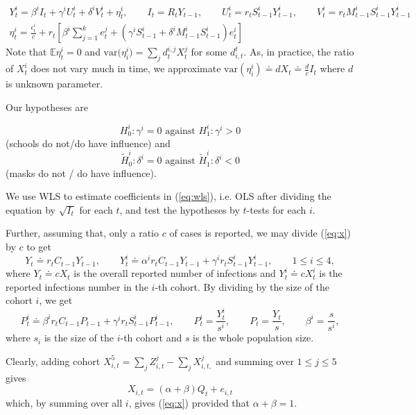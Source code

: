 \begin{multline*}
Y_{t}^{i}=\beta^{i}I_{t}+\gamma^{i}U_{t}^{i}+\delta^{i}V_{t}^{i}+\eta_{t}^{i},\qquad I_{t}=R_{t}Y_{t-1},\qquad U_{t}^{i}=r_{t}S_{t-1}^{i}Y_{t-1}^{i},\qquad V_{t}^{i}=r_{t}M_{t-1}^{i}S_{t-1}^{i}Y_{t-1}^{i}\\
\eta_{t}^{i}=\frac{\epsilon_{t}^{i}}{c}+r_{t}\left[\beta^{i}\sum_{j=1}^{k}e_{t}^{j}+(\gamma^{i}S_{t-1}^{i}+\delta^{i}M_{t-1}^{i}S_{t-1}^{i})e_{t}^{i}\right]
\end{multline*}
Note that $\mathbb{\ensuremath{E}}\eta_{t}^{i}=0$ and $\mathrm{var(}\eta_{i}^{i})=\sum_{j}d_{t}^{i,j}X_{t}^{j}$
for some $d_{i,t}^{t}$. As, in practice, the ratio of $X_{t}^{i}$
does not vary much in time, we approximate $\text{var}(\eta_{i}^{i})\doteq dX_{t}\doteq\frac{d}{c}I_{t}$
where $d$ is unknown parameter. 

Our hypotheses are 

\[
H_{0}^{i}:\gamma^{i}=0\text{ against }H_{1}^{i}:\gamma^{i}>0
\]
(schools do not/do have influence) and 
\[
\tilde{H}_{0}^{i}:\delta^{i}=0\text{ against }\tilde{H}_{1}^{i}:\delta^{i}<0
\]
(masks do not / do have influence).

We use WLS to estimate coefficients in (\ref{eq:wls}), i.e. OLS after
dividing the equation by $\sqrt{I_{t}}$ for each $t$, and test the
hypotheses by $t$-tests for each $i.$


Further, assuming that, only a ratio $c$ of cases is reported, we
may divide (\ref{eq:x}) by $c$ to get 
\begin{equation}
Y_{t}\doteq r_{t}C_{t-1}Y_{t-1},\qquad Y_{t}^{i}\doteq\alpha^{i}r_{t}C_{t-1}Y_{t-1}+\gamma^{i}r_{t}S_{t-1}^{i}Y_{t-1}^{i},\qquad1\leq i\leq4,\label{eq:y}
\end{equation}
where $Y_{t}\doteq cX_{t}$ is the overall reported number of infections
and $Y_{t}^{i}\doteq cX_{t}^{i}$ is the reported infections number
in the $i$-th cohort. By dividing by the size of the cohort $i$,
we get
\begin{equation}
P_{t}^{i}\doteq\beta^{i}r_{t}C_{t-1}P_{t-1}+\gamma^{i}r_{t}S_{t-1}^{i}P_{t-1}^{i},\qquad P_{t}^{i}=\frac{Y_{t}^{i}}{s^{i}},\qquad P_{t}=\frac{Y_{t}}{s},\qquad\beta^{i}=\frac{s}{s^{i}},\label{eq:prp}
\end{equation}
where $s_{i}$ is the size of the $i$-th cohort and $s$ is the whole
population size. 

Clearly, adding cohort $X^5_{i,t}=\sum_{j} Z^j_{i,t} - \sum_{j} X^j_{i,t,}$ and summing over $1\leq j \leq 5$ gives
\begin{equation}
X_{i,t} = (\alpha+\beta) Q_t + e_{i,t}
\label{eq:xi}
\end{equation}
which, by summing over all $i$, gives (\ref{eq:x}) provided that $\alpha + \beta = 1$.


